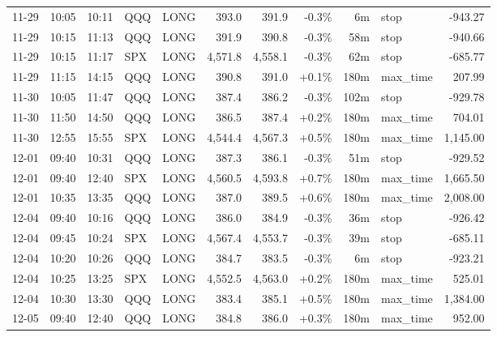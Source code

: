 \documentclass[11pt,a4paper,twoside]{article}
\begin{document}
\begin{center}
\begin{longtable}{>{\color{txtmain}}l l l l l r r r r >{\color{txtmain}}l r}
11-29 & 10:05 & 10:11 & QQQ & LONG & 393.0 & 391.9 & \textcolor{lossred}{-0.3\%} & 6m & stop & \textcolor{lossred}{-943.27} \\
11-29 & 10:15 & 11:13 & QQQ & LONG & 391.9 & 390.8 & \textcolor{lossred}{-0.3\%} & 58m & stop & \textcolor{lossred}{-940.66} \\
11-29 & 10:15 & 11:17 & SPX & LONG & 4,571.8 & 4,558.1 & \textcolor{lossred}{-0.3\%} & 62m & stop & \textcolor{lossred}{-685.77} \\
11-29 & 11:15 & 14:15 & QQQ & LONG & 390.8 & 391.0 & \textcolor{wingreen}{+0.1\%} & 180m & max\_time & \textcolor{wingreen}{207.99} \\
11-30 & 10:05 & 11:47 & QQQ & LONG & 387.4 & 386.2 & \textcolor{lossred}{-0.3\%} & 102m & stop & \textcolor{lossred}{-929.78} \\
11-30 & 11:50 & 14:50 & QQQ & LONG & 386.5 & 387.4 & \textcolor{wingreen}{+0.2\%} & 180m & max\_time & \textcolor{wingreen}{704.01} \\
11-30 & 12:55 & 15:55 & SPX & LONG & 4,544.4 & 4,567.3 & \textcolor{wingreen}{+0.5\%} & 180m & max\_time & \textcolor{wingreen}{1,145.00} \\
12-01 & 09:40 & 10:31 & QQQ & LONG & 387.3 & 386.1 & \textcolor{lossred}{-0.3\%} & 51m & stop & \textcolor{lossred}{-929.52} \\
12-01 & 09:40 & 12:40 & SPX & LONG & 4,560.5 & 4,593.8 & \textcolor{wingreen}{+0.7\%} & 180m & max\_time & \textcolor{wingreen}{1,665.50} \\
12-01 & 10:35 & 13:35 & QQQ & LONG & 387.0 & 389.5 & \textcolor{wingreen}{+0.6\%} & 180m & max\_time & \textcolor{wingreen}{2,008.00} \\
12-04 & 09:40 & 10:16 & QQQ & LONG & 386.0 & 384.9 & \textcolor{lossred}{-0.3\%} & 36m & stop & \textcolor{lossred}{-926.42} \\
12-04 & 09:45 & 10:24 & SPX & LONG & 4,567.4 & 4,553.7 & \textcolor{lossred}{-0.3\%} & 39m & stop & \textcolor{lossred}{-685.11} \\
12-04 & 10:20 & 10:26 & QQQ & LONG & 384.7 & 383.5 & \textcolor{lossred}{-0.3\%} & 6m & stop & \textcolor{lossred}{-923.21} \\
12-04 & 10:25 & 13:25 & SPX & LONG & 4,552.5 & 4,563.0 & \textcolor{wingreen}{+0.2\%} & 180m & max\_time & \textcolor{wingreen}{525.01} \\
12-04 & 10:30 & 13:30 & QQQ & LONG & 383.4 & 385.1 & \textcolor{wingreen}{+0.5\%} & 180m & max\_time & \textcolor{wingreen}{1,384.00} \\
12-05 & 09:40 & 12:40 & QQQ & LONG & 384.8 & 386.0 & \textcolor{wingreen}{+0.3\%} & 180m & max\_time & \textcolor{wingreen}{952.00} \\

\end{longtable}
\end{center}
\end{document}
